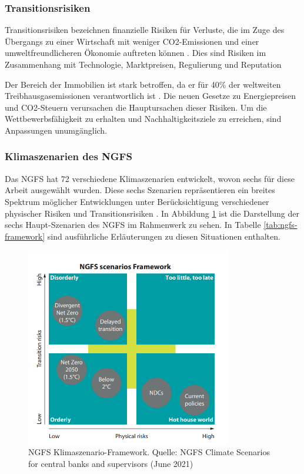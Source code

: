 \subsubsection{Transitionsrisiken}
Transitionsrisiken bezeichnen finanzielle Risiken für Verluste, die im Zuge des Übergangs zu einer Wirtschaft mit weniger CO2-Emissionen und einer umweltfreundlicheren Ökonomie auftreten können \parencite{ecb2020climate}. Dies sind Risiken im Zusammenhang mit Technologie, Marktpreisen, Regulierung und Reputation

Der Bereich der Immobilien ist stark betroffen, da er für 40\% der weltweiten Treibhausgasemissionen verantwortlich ist \parencite{unepfi2023realestate}. Die neuen Gesetze zu Energiepreisen und CO2-Steuern verursachen die Hauptursachen dieser Risiken. Um die Wettbewerbsfähigkeit zu erhalten und Nachhaltigkeitsziele zu erreichen, sind Anpassungen unumgänglich.


\subsubsection{Klimaszenarien des NGFS}\label{sec:ngfs}
Das \ac{NGFS} hat 72 verschiedene Klimaszenarien entwickelt, wovon sechs für diese Arbeit ausgewählt wurden. Diese sechs Szenarien repräsentieren ein breites Spektrum möglicher Entwicklungen unter Berücksichtigung verschiedener physischer Risiken und Transitionsrisiken \parencite{NGFS2021}. In Abbildung \ref{fig:ngfs} ist die Darstellung der sechs Haupt-Szenarien des NGFS im Rahmenwerk zu sehen. In Tabelle \ref{tab:ngfs-framework} sind ausführliche Erläuterungen zu diesen Situationen enthalten.

\begin{figure}[htbp]
    \centering
    \includegraphics[width=0.8\textwidth]{figures/NGFS.png}
    \caption{NGFS Klimaszenario-Framework. Quelle: NGFS Climate Scenarios for central banks and supervisors (June 2021)}
    \label{fig:ngfs}
\end{figure}
\FloatBarrier

